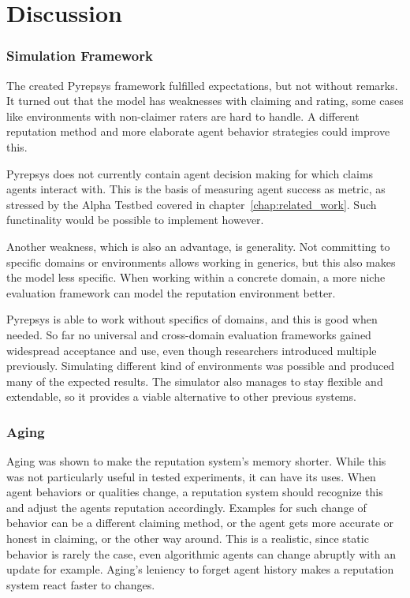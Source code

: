 \documentclass[%
    ]{\PathToTumTemplate/thesis/tum_thesis}
\begin{document}
\section{Discussion}\label{sec:discussion}


\subsubsection{Simulation Framework}
The created Pyrepsys framework fulfilled expectations, but not without remarks.
It turned out that the model has weaknesses with claiming and rating, some cases like environments with non-claimer raters are hard to handle.
A different reputation method and more elaborate agent behavior strategies could improve this.

Pyrepsys does not currently contain agent decision making for which claims agents interact with.
This is the basis of measuring agent success as metric, as stressed by the Alpha Testbed covered in chapter~\ref{chap:related_work}.
Such functinality would be possible to implement however.

Another weakness, which is also an advantage, is generality.
Not committing to specific domains or environments allows working in generics, but this also makes the model less specific.
When working within a concrete domain, a more niche evaluation framework can model the reputation environment better.

Pyrepsys is able to work without specifics of domains, and this is good when needed.
So far no universal and cross-domain evaluation frameworks gained widespread acceptance and use, even though researchers introduced multiple previously.
Simulating different kind of environments was possible and produced many of the expected results.
The simulator also manages to stay flexible and extendable, so it provides a viable alternative to other previous systems.


\subsubsection{Aging}
Aging was shown to make the reputation system's memory shorter.
While this was not particularly useful in tested experiments, it can have its uses.
When agent behaviors or qualities change, a reputation system should recognize this and adjust the agents reputation accordingly.
Examples for such change of behavior can be a different claiming method, or the agent gets more accurate or honest in claiming, or the other way around.
This is a realistic, since static behavior is rarely the case, even algorithmic agents can change abruptly with an update for example.
Aging's leniency to forget agent history makes a reputation system react faster to changes.
\end{document}

